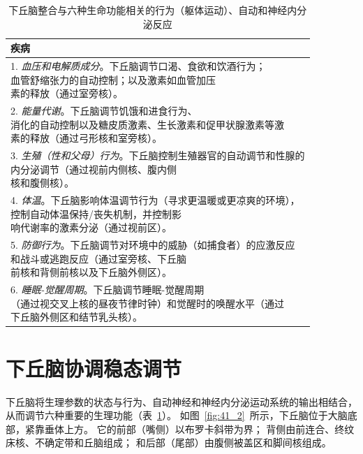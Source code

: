\begin{table}[htbp]
	\caption{下丘脑整合与六种生命功能相关的行为（躯体运动）、自动和神经内分泌反应} \label{tab:41_1} \centering
	\begin{tabular}{l}
		\toprule
		疾病 \\
		\midrule
		\makecell[l]{1. \textit{血压和电解质成分}。下丘脑调节口渴、食欲和饮酒行为；\\血管舒缩张力的自动控制；以及激素如血管加压\\素的释放（通过室旁核）。}  \\
		\makecell[l]{2. \textit{能量代谢}。下丘脑调节饥饿和进食行为、\\消化的自动控制以及糖皮质激素、生长激素和促甲状腺激素等激\\素的释放（通过弓形核和室旁核）。}  \\
		\makecell[l]{3. \textit{生殖（性和父母）行为}。下丘脑控制生殖器官的自动调节和性腺的\\内分泌调节（通过视前内侧核、腹内侧\\核和腹侧核）。}  \\
		\makecell[l]{4. \textit{体温}。下丘脑影响体温调节行为（寻求更温暖或更凉爽的环境），\\控制自动体温保持/丧失机制，并控制影\\响代谢率的激素分泌（通过视前区）。}  \\
		\makecell[l]{5. \textit{防御行为}。下丘脑调节对环境中的威胁（如捕食者）的应激反应\\和战斗或逃跑反应（通过室旁核、下丘脑\\前核和背侧前核以及下丘脑外侧区）。}  \\
		\makecell[l]{6. \textit{睡眠-觉醒周期}。下丘脑调节睡眠-觉醒周期\\（通过视交叉上核的昼夜节律时钟）和觉醒时的唤醒水平（通过\\下丘脑外侧区和结节乳头核）。}  \\
		\bottomrule
	\end{tabular}
\end{table}

\section{下丘脑协调稳态调节}

下丘脑将生理参数的状态与行为、自动神经和神经内分泌运动系统的输出相结合，从而调节六种重要的生理功能（表~\ref{tab:41_1}）。
如图~\ref{fig:41_2}~所示，下丘脑位于大脑底部，紧靠垂体上方。
它的前部（嘴侧）以布罗卡斜带为界；
背侧由前连合、终纹床核、不确定带和丘脑组成；
和后部（尾部）由腹侧被盖区和脚间核组成。


